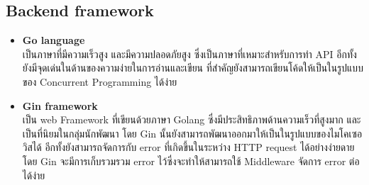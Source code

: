 \documentclass[12pt,oneside,openright,a4paper]{cpe-thai-project}
\begin{document}
\subsection{Backend framework}
\begin{itemize}
  \item \textbf{Go language} \\
  \hspace*{1cm} เป็นภาษาที่มีความเร็วสูง และมีความปลอดภัยสูง ซึ่งเป็นภาษาที่เหมาะสำหรับการทำ API อีกทั้งยังมีจุดเด่นในด้านของความง่ายในการอ่านและเขียน ที่สำคัญยังสามารถเขียนโค้ดให้เป็นในรูปแบบของ Concurrent Programming \cite{WhatIsConcurrentProgramming} ได้ง่าย
  \item \textbf{Gin framework} \\
\hspace*{1cm} เป็น web Framework ที่เขียนด้วยภาษา Golang ซึ่งมีประสิทธิภาพด้านความเร็วที่สูงมาก และเป็นที่นิยมในกลุ่มนักพัฒนา โดย Gin นั้นยังสามารถพัฒนาออกมาให้เป็นในรูปแบบของไมโคเซอวิสได้ อีกทั้งยังสามารถจัดการกับ error ที่เกิดขึ้นในระหว่าง HTTP request ได้อย่างง่ายดายโดย Gin จะมีการเก็บรวมรวม error ไว้ซึ่งจะทำให้สามารถใช้ Middleware จัดการ error ต่อได้ง่าย
\end{itemize}
\end{document}
